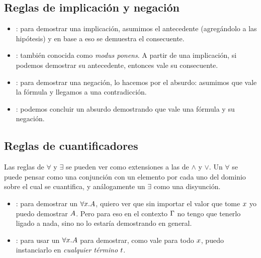 \subsection{Reglas de implicación y negación}

\begin{multicols}{2}
    \proofTreeImpI
    \proofTreeImpE
\end{multicols}

\proofSpacing

\begin{multicols}{2}
    \proofTreeNotI
    \proofTreeNotE
\end{multicols}

\begin{itemize}
    \item {}: para demostrar una implicación, asumimos el antecedente
    (agregándolo a las hipótesis) y en base a eso se demuestra el consecuente.
    \item {}: también conocida como \textit{modus ponens}. A partir de
    una implicación, si podemos demostrar su antecedente, entonces vale su consecuente.
    \item {}: para demostrar una negación, lo hacemos por el absurdo:
    asumimos que vale la fórmula y llegamos a una contradicción.
    \item {}: podemos concluir un absurdo demostrando que vale una
    fórmula y su negación.
\end{itemize}

\subsection{Reglas de cuantificadores}

Las reglas de $\forall$ y $\exists$ se pueden ver como extensiones a las de
$\wedge$ y $\vee$. Un $\forall$ se puede pensar como una conjunción con un
elemento por cada uno del dominio sobre el cual se cuantifica, y análogamente un $\exists$ como una disyunción.

\begin{multicols}{2}
    \proofTreeForallI
    \proofTreeForallE
\end{multicols}

\begin{itemize}
    \item {}: para demostrar un $\forall x. A$, quiero ver que sin importar el valor que tome $x$ yo puedo demostrar $A$. Pero para eso en el contexto $\Gamma$ no tengo que tenerlo ligado a nada, sino no lo estaría demostrando en general.
    \item {}: para usar un $\forall x.A$ para demostrar, como
    vale para todo $x$, puedo instanciarlo en \textit{cualquier término} $t$.
\end{itemize}

